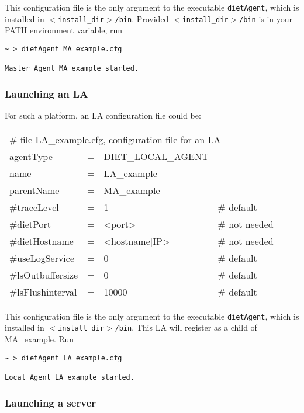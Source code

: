 This configuration file is the only argument to the executable
\texttt{dietAgent}, which is installed in
\texttt{$<$install\_dir$>$/bin}. Provided
\texttt{$<$install\_dir$>$/bin} is in your PATH environment variable, run
{\footnotesize
\begin{verbatim}
~ > dietAgent MA_example.cfg

Master Agent MA_example started.
\end{verbatim}
}


\subsubsection{Launching an LA}

For such a platform, an LA configuration file could be:
\tt
\begin{center}
 \footnotesize
 \begin{tabular}{lcll}
  \multicolumn{4}{l}{\# file LA\_example.cfg, configuration file for an LA}\\
  agentType    &=&DIET\_LOCAL\_AGENT&\\
  name         &=&LA\_example       &\\
  parentName   &=&MA\_example       &\\
  \#traceLevel &=&1                 &\# default\\
  \#dietPort    &=&<port>             &\# not needed\\
  \#dietHostname&=&<hostname|IP>      &\# not needed\\
  \#useLogService &=& 0               &\# default\\
  \#lsOutbuffersize &=& 0             &\# default\\
  \#lsFlushinterval &=& 10000           &\# default\\
 \end{tabular}
\end{center}
\rm

This configuration file is the only argument to the executable
\texttt{dietAgent}, which is installed in \texttt{$<$install\_dir$>$/bin}. This
LA will register as a child of MA\_example. Run {\footnotesize
\begin{verbatim}
~ > dietAgent LA_example.cfg

Local Agent LA_example started.

\end{verbatim}
}

\subsubsection{Launching a server}


